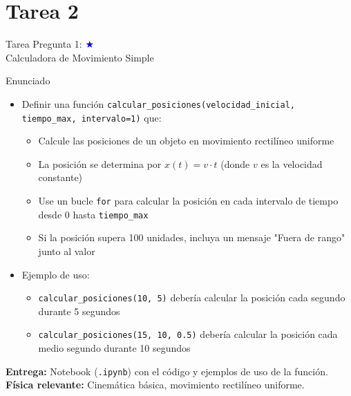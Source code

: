 \documentclass[10pt]{beamer}
\begin{document}
\iffalse
\section{Tarea 2}

\begin{frame}{Tarea Pregunta 1: \hfill \textcolor{blue}{$\bigstar$} \\ Calculadora de Movimiento Simple}
  \begin{block}{Enunciado}
    \begin{itemize}
      \item Definir una función \texttt{calcular\_posiciones(velocidad\_inicial, tiempo\_max, intervalo=1)} que:
        \begin{itemize}
          \item Calcule las posiciones de un objeto en movimiento rectilíneo uniforme
          \item La posición se determina por $x(t) = v \cdot t$ (donde $v$ es la velocidad constante)
          \item Use un bucle \texttt{for} para calcular la posición en cada intervalo de tiempo desde 0 hasta \texttt{tiempo\_max}
          \item Si la posición supera 100 unidades, incluya un mensaje "Fuera de rango" junto al valor
        \end{itemize}
      \item Ejemplo de uso:
        \begin{itemize}
          \item \texttt{calcular\_posiciones(10, 5)} debería calcular la posición cada segundo durante 5 segundos
          \item \texttt{calcular\_posiciones(15, 10, 0.5)} debería calcular la posición cada medio segundo durante 10 segundos
        \end{itemize}
    \end{itemize}
  \end{block}
  
  \textbf{Entrega:} Notebook (\texttt{.ipynb}) con el código y ejemplos de uso de la función.\\
  \textbf{Física relevante:} Cinemática básica, movimiento rectilíneo uniforme.
\end{frame}
\end{document}
